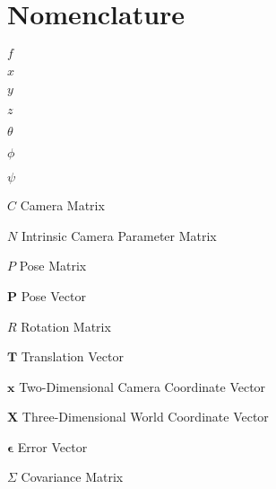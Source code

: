 \chapter{Nomenclature}

\begin{Nomencl}[2cm]

   \item[$f$]	      
   \item[$x$]         
   \item[$y$]         
   \item[$z$]         
   \item[$\theta$]    
   \item[$\phi$]      
   \item[$\psi$]      \\

   \item[$C$]		Camera Matrix
   \item[$N$]		Intrinsic Camera Parameter Matrix
   \item[$P$]		Pose Matrix
   \item[$\bm{P}$]	Pose Vector
   \item[$R$]		Rotation Matrix
   \item[$\bm{T}$]	Translation Vector
   \item[$\bm{x}$]	Two-Dimensional Camera Coordinate Vector
   \item[$\bm{X}$]	Three-Dimensional World Coordinate Vector
   \item[$\bm{\epsilon}$]	Error Vector
   \item[$\Sigma$] 	Covariance Matrix


\end{Nomencl}
